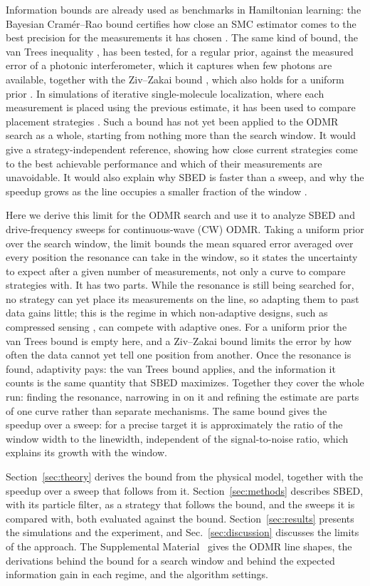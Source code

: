 Information bounds are already used as
benchmarks in Hamiltonian learning: the Bayesian Cram\'er--Rao bound certifies how close an SMC estimator comes to
the best precision for the measurements it has chosen \cite{granade2012}. The same kind of bound, the van Trees
inequality \cite{vantrees1968,gill1995}, has been tested, for a regular prior, against the measured error of a
photonic interferometer, which it captures when few photons are available, together with the Ziv--Zakai bound
\cite{zivzakai1969,bell1997}, which also holds for a uniform prior \cite{daurelio2022}. In simulations of iterative single-molecule
localization, where each measurement is placed using the previous estimate, it has been used to compare placement
strategies \cite{kalisvaart2022}. Such a bound has not yet been applied to
the ODMR search as a whole, starting from nothing more than the search window. It would give a strategy-independent
reference, showing how close current strategies come to the best achievable
performance and which of their measurements are unavoidable. It would also explain why SBED is faster than a
sweep, and why the speedup grows as the line occupies a smaller fraction of the window
\cite{dushenko2020sbed}.

Here we derive this limit for the ODMR search and use it to analyze SBED and drive-frequency sweeps for
continuous-wave (CW) ODMR. Taking a uniform prior over the search window, the limit bounds the mean squared error averaged
over every position the resonance can take in the window, so it states the uncertainty to expect after a given
number of measurements, not only a curve to compare strategies with. It has two parts. While the resonance is still
being searched for, no strategy can yet place its measurements on the line, so adapting them to past data gains
little; this is the regime in which non-adaptive designs, such as compressed sensing \cite{haim2025}, can compete with
adaptive ones. For a uniform prior the van Trees bound is empty here, and a Ziv--Zakai bound
\cite{zivzakai1969,bell1997} limits the error by how often the data cannot yet tell one position from another. Once
the resonance is found, adaptivity pays: the van Trees bound \cite{vantrees1968,gill1995} applies, and the
information it counts is the same quantity that SBED maximizes.
Together they cover the whole run: finding the
resonance, narrowing in on it and refining the estimate are parts of one curve rather than separate mechanisms. The same bound gives
the speedup over a sweep: for a precise target it is approximately the ratio of the window width to the linewidth,
independent of the signal-to-noise ratio, which explains its growth with the window.

Section~\ref{sec:theory} derives the bound from the physical model, together with the speedup over a sweep that
follows from it. Section~\ref{sec:methods} describes SBED, with its particle filter, as a strategy that
follows the bound, and the sweeps it is compared with, both evaluated against the bound. Section~\ref{sec:results} presents the simulations and the experiment, and Sec.~\ref{sec:discussion}
discusses the limits of the approach. The Supplemental Material~\cite{supp} gives the ODMR line shapes, the
derivations behind the bound for a search window and behind the expected information gain in each regime, and the
algorithm settings.
